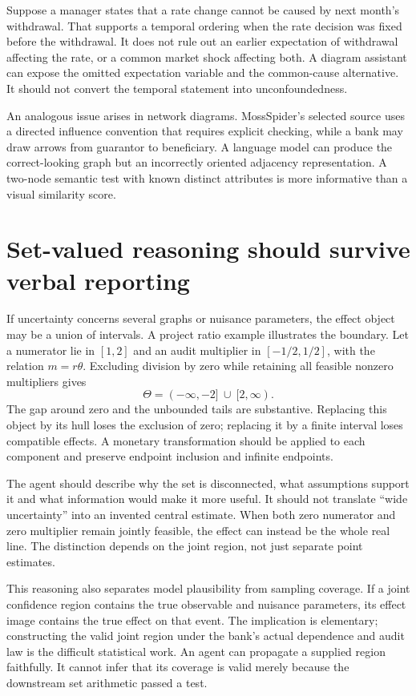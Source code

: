 Suppose a manager states that a rate change cannot be caused by next month's
withdrawal. That supports a temporal ordering when the rate decision was fixed
before the withdrawal. It does not rule out an earlier expectation of withdrawal
affecting the rate, or a common market shock affecting both. A diagram assistant
can expose the omitted expectation variable and the common-cause alternative.
It should not convert the temporal statement into unconfoundedness.

An analogous issue arises in network diagrams. MossSpider's selected source
uses a directed influence convention that requires explicit checking, while a
bank may draw arrows from guarantor to beneficiary. A language model can produce
the correct-looking graph but an incorrectly oriented adjacency representation.
A two-node semantic test with known distinct attributes is more informative
than a visual similarity score. \citep{v13_sw_mossspider}

\section{Set-valued reasoning should survive verbal reporting}

If uncertainty concerns several graphs or nuisance parameters, the effect
object may be a union of intervals. A project ratio example illustrates the
boundary. Let a numerator lie in $[1,2]$ and an audit multiplier in
$[-1/2,1/2]$, with the relation $m=r\theta$. Excluding division by zero while
retaining all feasible nonzero multipliers gives
\[
 \Theta=(-\infty,-2]\ \cup\ [2,\infty).
\]
The gap around zero and the unbounded tails are substantive. Replacing this
object by its hull loses the exclusion of zero; replacing it by a finite
interval loses compatible effects. A monetary transformation should be applied
to each component and preserve endpoint inclusion and infinite endpoints.

The agent should describe why the set is disconnected, what assumptions support
it and what information would make it more useful. It should not translate
``wide uncertainty'' into an invented central estimate. When both zero numerator
and zero multiplier remain jointly feasible, the effect can instead be the
whole real line. The distinction depends on the joint region, not just
separate point estimates.

This reasoning also separates model plausibility from sampling coverage. If a
joint confidence region contains the true observable and nuisance parameters,
its effect image contains the true effect on that event. The implication is
elementary; constructing the valid joint region under the bank's actual
dependence and audit law is the difficult statistical work. An agent can
propagate a supplied region faithfully. It cannot infer that its coverage is
valid merely because the downstream set arithmetic passed a test.


